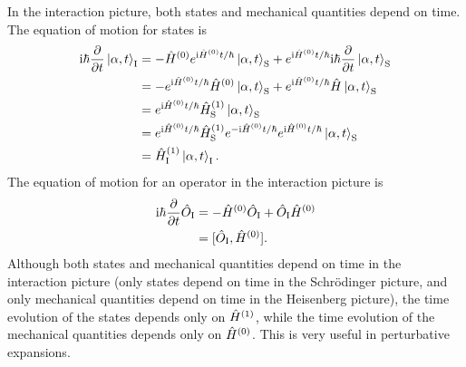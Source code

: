 In the interaction picture, both states and mechanical quantities depend on time. The equation of motion for states is
\begin{equation}\begin{aligned}
 \mathrm{i}\hbar\frac{\partial}{\partial t}\left|\alpha,t\right\rangle_{\mathrm I}
 &=-\hat{H}^{(0)}e^{\mathrm{i}\hat{H}^{(0)}t/\hbar}\left|\alpha,t\right\rangle_{\mathrm S}
 +e^{\mathrm{i}\hat{H}^{(0)}t/\hbar}
 \mathrm{i}\hbar\frac{\partial}{\partial t}\left|\alpha,t\right\rangle_{\mathrm S}\\
 &=-e^{\mathrm{i}\hat{H}^{(0)}t/\hbar}\hat{H}^{(0)}\left|\alpha,t\right\rangle_{\mathrm S}
 +e^{\mathrm{i}\hat{H}^{(0)}t/\hbar}\hat{H}\left|\alpha,t\right\rangle_{\mathrm S}\\
 &=e^{\mathrm{i}\hat{H}^{(0)}t/\hbar}\hat{H}^{(1)}_{\mathrm S}\left|\alpha,t\right\rangle_{\mathrm S}\\
 &=e^{\mathrm{i}\hat{H}^{(0)}t/\hbar}\hat{H}_{\mathrm S}^{(1)}
 e^{-\mathrm{i}\hat{H}^{(0)}t/\hbar}
 e^{\mathrm{i}\hat{H}^{(0)}t/\hbar}\left|\alpha,t\right\rangle_{\mathrm S}\\
 &=\hat{H}^{(1)}_{\mathrm I}\left|\alpha,t\right\rangle_{\mathrm I}.
\end{aligned}\end{equation}
The equation of motion for an operator in the interaction picture is
\begin{equation}\begin{aligned}
 \mathrm{i}\hbar\frac{\partial}{\partial t}\hat{O}_{\mathrm I}
 &=-\hat{H}^{(0)}\hat{O}_{\mathrm I}+\hat{O}_{\mathrm I}\hat{H}^{(0)}\\
 &=[\hat{O}_{\mathrm I},\hat{H}^{(0)}].
\end{aligned}\end{equation}
Although both states and mechanical quantities depend on time in the interaction picture (only states depend on time in the Schr\"odinger picture, and only mechanical quantities depend on time in the Heisenberg picture), the time evolution of the states depends only on $\hat{H}^{(1)}$, while the time evolution of the mechanical quantities depends only on $\hat{H}^{(0)}$. This is very useful in perturbative expansions.

